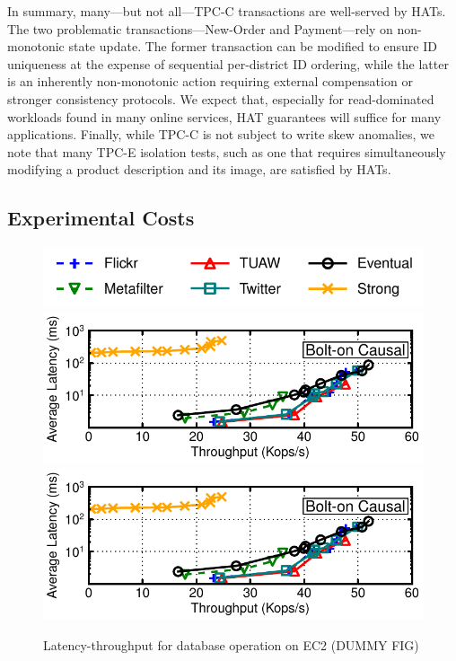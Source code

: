 In summary, many---but not all---TPC-C transactions are well-served by
HATs. The two problematic transactions---New-Order and Payment---rely
on non-monotonic state update. The former transaction can be modified
to ensure ID uniqueness at the expense of sequential per-district ID
ordering, while the latter is an inherently non-monotonic action
requiring external compensation or stronger consistency protocols. We
expect that, especially for read-dominated workloads found in many
online services, HAT guarantees will suffice for many
applications. Finally, while TPC-C is not subject to write skew
anomalies, we note that many TPC-E isolation tests, such as one that
requires simultaneously modifying a product description and its image,
are satisfied by HATs.

\subsection{Experimental Costs}

\begin{figure}
\includegraphics[width=.8\columnwidth]{figs/macrotracelegend.pdf}\vspace{-2mm}
\includegraphics[width=\columnwidth]{figs/lat-thru-trace-K0-SCALEMACRO.pdf}
\includegraphics[width=\columnwidth]{figs/lat-thru-trace-K0-SCALEMACRO.pdf}
\caption{Latency-throughput for database operation on EC2 (DUMMY FIG)}
\label{fig:wan-exp}
\end{figure}

